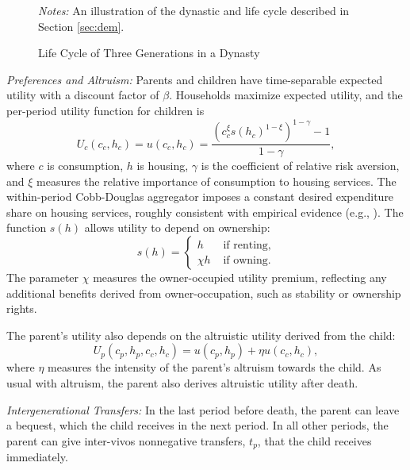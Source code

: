 \documentclass[12pt]{article}
\begin{document}
\begin{figure}\begin{center}
	\caption{Life Cycle of Three Generations in a Dynasty }\label{fig:overview}
	
	{\begin{footnotesize} \textit{Notes:} An illustration of the dynastic and life cycle described in Section \ref{sec:dem}.\end{footnotesize}}
\end{center}
\end{figure}

\textit{Preferences and Altruism:} Parents and children have time-separable expected utility with a discount factor of $\beta$. Households maximize expected utility, and the per-period utility function for children is
\begin{equation}
U_c(c_c,h_c) = u(c_c,h_c) = \frac{\left(c_c^\xi s(h_c)^{1-\xi}\right)^{1-\gamma}-1}{1-\gamma},
\end{equation}
where $c$ is consumption, $h$ is housing, $\gamma$ is the coefficient of relative risk aversion, and $\xi$ measures the relative importance of consumption to housing services. The within-period Cobb-Douglas aggregator imposes a constant desired expenditure share on housing services, roughly consistent with empirical evidence (e.g., \cite{davis2011household}). The function $s(h)$ allows utility to depend on ownership:
\begin{equation}
s(h) = \begin{cases}
h & \text{ if renting}, \\
\chi h & \text{ if owning}.
\end{cases}
\end{equation}
The parameter $\chi$ measures the owner-occupied utility premium, reflecting any additional benefits derived from owner-occupation, such as stability or ownership rights.

The parent's utility also depends on the altruistic utility derived from the child:
\begin{equation}
U_p(c_p,h_p,c_c,h_c) = u(c_p,h_p) + \eta u(c_c,h_c),
\end{equation}
where $\eta$ measures the intensity of the parent's altruism towards the child. As usual with altruism, the parent also derives altruistic utility after death.

\textit{Intergenerational Transfers:} In the last period before death, the parent can leave a bequest, which the child receives in the next period. In all other periods, the parent can give inter-vivos nonnegative transfers, $t_p$, that the child receives immediately.
\end{document}
